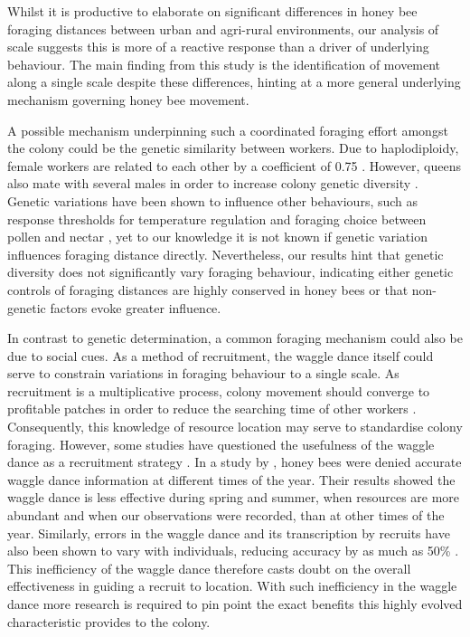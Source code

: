 \documentclass[11pt,usenames,dvipsnames,a4paper]{article}
\begin{document}
\begin{linenumbers}
Whilst it is productive to elaborate on significant differences in honey bee foraging distances between urban and agri-rural environments, our analysis of scale suggests this is more of a reactive response than a driver of underlying behaviour. The main finding from this study is the identification of movement along a single scale despite these differences, hinting at a more general underlying mechanism governing honey bee movement.

A possible mechanism underpinning such a coordinated foraging effort amongst the colony could be the genetic similarity between workers. Due to haplodiploidy, female workers are related to each other by a coefficient of 0.75 \citep{Ratnieks1989}. However, queens also mate with several males in order to increase colony genetic diversity \citep{Jones2004}. Genetic variations have been shown to influence other behaviours, such as response thresholds for temperature regulation \citep{Jones2004} and foraging choice between pollen and nectar \citep{Fewell1993, Fewell2000}, yet to our knowledge it is not known if genetic variation influences foraging distance directly. Nevertheless, our results hint that genetic diversity does not significantly vary foraging behaviour, indicating either genetic controls of foraging distances are highly conserved in honey bees or that non-genetic factors evoke greater influence.

In contrast to genetic determination, a common foraging mechanism could also be due to social cues. As a method of recruitment, the waggle dance itself could serve to constrain variations in foraging behaviour to a single scale. As recruitment is a multiplicative process, colony movement should converge to profitable patches in order to reduce the searching time of other workers \citep{Seeley1995}. Consequently, this knowledge of resource location may serve to standardise colony foraging. However, some studies have questioned the usefulness of the waggle dance as a recruitment strategy \citep{Sherman2002, Dornhaus2004, Gruter2008, Gruter2009, Schurch2013}. In a study by \cite{Sherman2002}, honey bees were denied accurate waggle dance information at different times of the year. Their results showed the waggle dance is less effective during spring and summer, when resources are more abundant and when our observations were recorded, than at other times of the year. Similarly, errors in the waggle dance and its transcription by recruits have also been shown to vary with individuals, reducing accuracy by as much as 50\% \citep{Schurch2013}. This inefficiency of the waggle dance therefore casts doubt on the overall effectiveness in guiding a recruit to location. With such inefficiency in the waggle dance more research is required to pin point the exact benefits this highly evolved characteristic provides to the colony.


\end{linenumbers}
\end{document}
